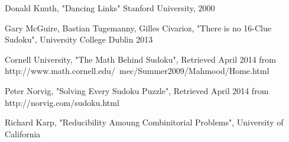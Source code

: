 
\begin{thebibliography}{1}

Donald Knuth, "Dancing Links" Stanford University, 2000

Gary McGuire, Bastian Tugemanny, Gilles Civarioz, "There is no 16-Clue Sudoku", University College Dublin 2013

Cornell University, "The Math Behind Sudoku", Retrieved April 2014 from http://www.math.cornell.edu/~mec/Summer2009/Mahmood/Home.html

Peter Norvig, "Solving Every Sudoku Puzzle", Retrieved April 2014 from http://norvig.com/sudoku.html

Richard Karp, "Reducibility Amoung Combinitorial Problems", University of California

\end{thebibliography}

